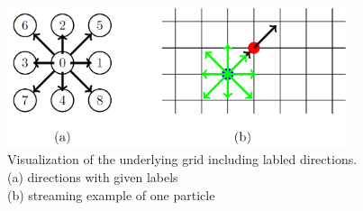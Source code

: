 \begin{figure}[H]
    \begin{center}
        \includegraphics[width=10cm]{logos/Gitter_LBM.png}
        \caption[Visualization of the underlying grid including labled directions.]{
            Visualization of the underlying grid including labled directions. \\
            (a) directions with given labels \\
            (b) streaming example of one particle
        }
        \label{fig:bte-scheme}
    \end{center}
\end{figure}
